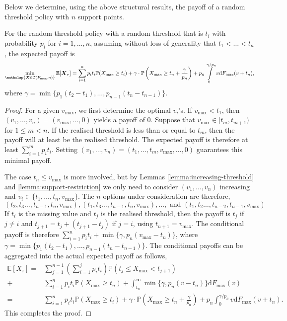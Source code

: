 \documentclass[11pt,a4paper]{article}
\numberwithin{equation}{section}
\begin{document}
Below we determine, using the above structural results, the payoff of a random threshold policy with $n$ support points.

\begin{lemma}
    \label{lemma:expected-payoff-n-point-policy}
    For the random threshold policy with a random threshold that is $t_i$ with probability $p_i$ for $i = 1,\dots,n$, assuming without loss of generality that $t_1<\dots<t_n$, the expected payoff is
    $$
    \min_{\mathclap{\boldsymbol{X}\in\mathcal{I}(F_{\max},n)}} \mathbb{E}[\boldsymbol{X}_{\tau}]=
    \sum_{i=1}^np_it_i \mathbb{P}(X_{\max}\ge t_i)+\gamma\cdot\mathbb{P}\left(X_{\max}\ge t_n+\frac{\gamma}{p_n}\right)+p_n\int\limits_0^{\gamma/p_n}v\mathrm{d}F_{\max}(v+t_n),
    $$
    where $\gamma=\min\{p_1(t_2-t_1),\dots,p_{n-1}(t_n-t_{n-1})\}$.
\end{lemma}
\begin{proof}
    For a given $v_{\max}$, we first determine the optimal $v_i$'s.
    If $v_{\text{max}}<t_1$, then $(v_1,\dots,v_n)=(v_{\text{max}},\dots,0)$ yields a payoff of $0$.
    Suppose that $v_{\max}\in[t_m,t_{m+1})$ for $1\le m < n$. If the realised threshold is less than or equal to $t_m$, then the payoff will at least be the realised threshold. The expected payoff is therefore at least $\sum_{i=1}^mp_it_i$. Setting $(v_1,\dots,v_n)=(t_1,\dots,t_m,v_{\text{max}},\dots,0)$ guarantees this minimal payoff.
    
    The case $t_n\le v_{\text{max}}$ is more involved, but by Lemmas \ref{lemma:increasing-threshold} and \ref{lemma:support-restriction} we only need to consider $(v_1,\dots,v_n)$ increasing and $v_i\in\{t_1,\dots,t_n,v_{\text{max}}\}$. The $n$ options under consideration are therefore, 
    $$(t_2,t_3\dots,t_{n-1}, t_n,v_{\text{max}}),(t_1,t_3\dots,t_{n-1}, t_n,v_{\text{max}}), \dots,\text{ and }(t_1,t_2\dots,t_{n-2},t_{n-1},v_{\text{max}})$$
    If $t_i$ is the missing value and $t_j$ is the realised threshold, then the payoff is $t_j$ if $j\ne i$ and $t_{j+1}=t_j+(t_{j+1}-t_j)$ if $j=i$, using $t_{n+1}=v_{\max}$. The conditional payoff is therefore $\sum_{i=1}^np_it_i+\min\{\gamma,p_n(v_{\max}-t_n)\}$, where $\gamma = \min\{p_1(t_2-t_1),\dots,p_{n-1}(t_n-t_{n-1})\}$.
    The conditional payoffs can be aggregated into the actual expected payoff as follows,
    \begin{align*}
        \mathbb{E}[X_{\tau}]=&
        \sum^{n-1}_{j=1}\left(\sum_{i=1}^jp_it_i\right)\mathbb{P}(t_j\le X_{\max}<t_{j+1})\\
        +&\sum_{i=1}^np_it_i\mathbb{P}(X_{\max}\ge t_n)+\int_{t_n}^\infty\min\{\gamma,p_n(v-t_n)\}\mathrm{d}F_{\max}(v)\\=&\sum_{i=1}^np_it_i \mathbb{P}(X_{\max}\ge t_i)+\gamma\cdot\mathbb{P}\left(X_{\max}\ge t_n+\frac{\gamma}{p_n}\right)+p_n\int_0^{\gamma/p_n}v\mathrm{d}F_{\max}(v+t_n).
    \end{align*}
    This completes the proof.
\end{proof}
\end{document}
